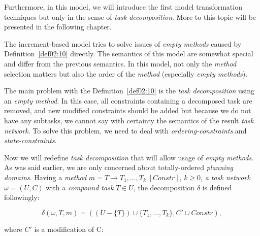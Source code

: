 \medskip\noindent
Furthermore, in this model, we will introduce the first model transformation techniques but only in the sense of \emph{task decomposition}. More to this topic will be presented in the following chapter.

\medskip\noindent
The increment-based model tries to solve issues of \emph{empty methods} caused by Definition~\ref{def02:10} directly. The semantics of this model are somewhat special and differ from the previous semantics. In this model, not only the \emph{method} selection matters but also the order of the \emph{method} (especially \emph{empty methods}).

\medskip\noindent
The main problem with the Definition~\ref{def02:10} is the \emph{task decomposition} using an \emph{empty method}. In this case, all constraints containing a decomposed task are removed, and new modified constraints should be added but because we do not have any subtasks, we cannot say with certainty the semantics of the result \emph{task network}. To solve this problem, we need to deal with \emph{ordering-constraints} and \emph{state-constraints}. 

\medskip\noindent
Now we will redefine \emph{task decomposition} that will allow usage of \emph{empty methods}. As was said earlier, we are only concerned about totally-ordered \emph{planning domains}. Having a \emph{method} $m = T \rightarrow T_1, \dots, T_k \; [Constr]$, $k \geq 0$, \emph{a task network} $\omega = (U, C)$ with a \emph{compound task} $T \in U$, the decomposition $\delta$ is defined followingly:

\[
    \delta(\omega, T, m) = ((U - \{ T \}) \cup \{T_1, \dots, T_k\}, C' \cup Constr),
\]

\noindent
where $C'$ is a modification of C:

